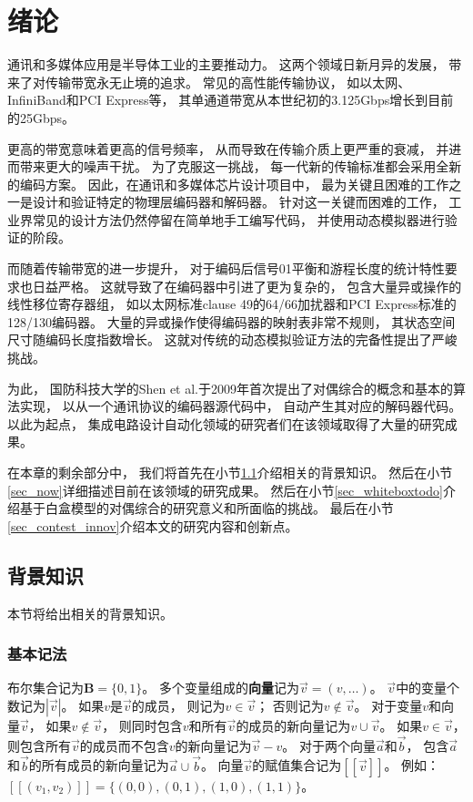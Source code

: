 \chapter{绪论}
\label{chap:1}

通讯和多媒体应用是半导体工业的主要推动力。
这两个领域日新月异的发展，
带来了对传输带宽永无止境的追求。
常见的高性能传输协议，
如以太网、InfiniBand和PCI Express等，
其单通道带宽从本世纪初的3.125Gbps增长到目前的25Gbps。

更高的带宽意味着更高的信号频率，
从而导致在传输介质上更严重的衰减，
并进而带来更大的噪声干扰。
为了克服这一挑战，
每一代新的传输标准都会采用全新的编码方案。
因此，在通讯和多媒体芯片设计项目中，
最为关键且困难的工作之一是设计和验证特定的物理层编码器和解码器。
针对这一关键而困难的工作，
工业界常见的设计方法仍然停留在简单地手工编写代码，
并使用动态模拟器进行验证的阶段。

而随着传输带宽的进一步提升，
对于编码后信号01平衡和游程长度的统计特性要求也日益严格。
这就导致了在编码器中引进了更为复杂的，
包含大量异或操作的线性移位寄存器组，
如以太网标准clause 49的64/66加扰器和PCI Express标准的128/130编码器。
大量的异或操作使得编码器的映射表非常不规则，
其状态空间尺寸随编码长度指数增长。
这就对传统的动态模拟验证方法的完备性提出了严峻挑战。

为此，
国防科技大学的Shen et al.于2009年首次提出了对偶综合的概念和基本的算法实现，
以从一个通讯协议的编码器源代码中，
自动产生其对应的解码器代码。
以此为起点，
集成电路设计自动化领域的研究者们在该领域取得了大量的研究成果。

在本章的剩余部分中，
我们将首先在小节\ref{sec_back}介绍相关的背景知识。
然后在小节\ref{sec_now}详细描述目前在该领域的研究成果。
然后在小节\ref{sec_whiteboxtodo}介绍基于白盒模型的对偶综合的研究意义和所面临的挑战。
最后在小节\ref{sec_contest_innov}介绍本文的研究内容和创新点。



\section{背景知识}\label{sec_back}
本节将给出相关的背景知识。

\subsection{基本记法}
布尔集合记为$\mathbf{B}=\{0,1\}$。
多个变量组成的\textbf{向量}记为$\vec{v}=(v,\dots)$。
$\vec{v}$中的变量个数记为$|\vec{v}|$。
如果$v$是$\vec{v}$的成员，
则记为$v\in\vec{v}$；
否则记为$v\notin\vec{v}$。
对于变量$v$和向量$\vec{v}$，
如果$v\notin\vec{v}$，
则同时包含$v$和所有$\vec{v}$的成员的新向量记为$v\cup\vec{v}$。
如果$v\in \vec{v}$，
则包含所有$\vec{v}$的成员而不包含$v$的新向量记为$\vec{v}-v$。
对于两个向量$\vec{a}$和$\vec{b}$，
包含$\vec{a}$和$\vec{b}$的所有成员的新向量记为$\vec{a}\cup\vec{b}$。
向量$\vec{v}$的赋值集合记为$[\![\vec{v}]\!]$。
例如：
$[\![(v_1,v_2)]\!]=\{(0,0),(0,1),(1,0),(1,1)\}$。

